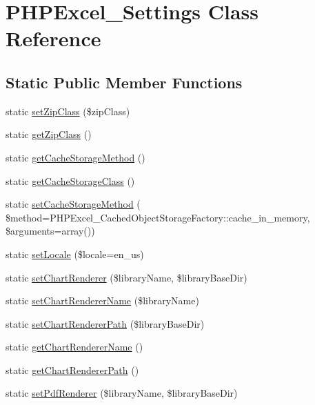 \hypertarget{classPHPExcel__Settings}{}\section{P\+H\+P\+Excel\+\_\+\+Settings Class Reference}
\label{classPHPExcel__Settings}
\subsection*{Static Public Member Functions}
\begin{DoxyCompactItemize}
\item 
static \hyperlink{classPHPExcel__Settings_ac32427c3ef323ba4050d8ed808a0bb9a}{set\+Zip\+Class} (\$zip\+Class)
\item 
static \hyperlink{classPHPExcel__Settings_aac53e21ae693adafef6fee652110bdeb}{get\+Zip\+Class} ()
\item 
static \hyperlink{classPHPExcel__Settings_afdb3b6308a8f526526dad82b7c7d9b8e}{get\+Cache\+Storage\+Method} ()
\item 
static \hyperlink{classPHPExcel__Settings_ac77e80bd77ac4ee15c7a85444013e6fb}{get\+Cache\+Storage\+Class} ()
\item 
static \hyperlink{classPHPExcel__Settings_a6ade9c1b3607e14703c015483c37b71a}{set\+Cache\+Storage\+Method} ( \$method=P\+H\+P\+Excel\+\_\+\+Cached\+Object\+Storage\+Factory\+::cache\+\_\+in\+\_\+memory, \$arguments=array())
\item 
static \hyperlink{classPHPExcel__Settings_af7c63bca5c79932a4a046d2030a258d2}{set\+Locale} (\$locale=\textquotesingle{}en\+\_\+us\textquotesingle{})
\item 
static \hyperlink{classPHPExcel__Settings_accab2d9626b04440605216956e42d3b1}{set\+Chart\+Renderer} (\$library\+Name, \$library\+Base\+Dir)
\item 
static \hyperlink{classPHPExcel__Settings_abaffd46a428091b47db7ef4ef816bebe}{set\+Chart\+Renderer\+Name} (\$library\+Name)
\item 
static \hyperlink{classPHPExcel__Settings_a1eb3096fe1afed3fadb6575e077e0975}{set\+Chart\+Renderer\+Path} (\$library\+Base\+Dir)
\item 
static \hyperlink{classPHPExcel__Settings_ae3f965881b9af1fe436fb6dda751474f}{get\+Chart\+Renderer\+Name} ()
\item 
static \hyperlink{classPHPExcel__Settings_a40a645439b4ad20428d867afd34c2fc4}{get\+Chart\+Renderer\+Path} ()
\item 
static \hyperlink{classPHPExcel__Settings_afe83e079e4fdb9f1e5de4f74ea0a7877}{set\+Pdf\+Renderer} (\$library\+Name, \$library\+Base\+Dir)

\end{DoxyCompactItemize}
